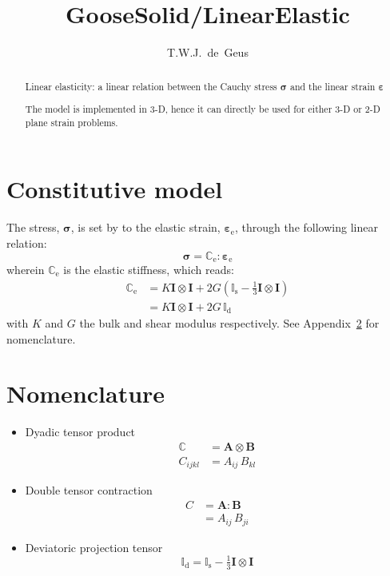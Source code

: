 \documentclass[times,namecite]{goose-article}
\title{%
  GooseSolid/LinearElastic
}
\author{T.W.J.~de~Geus}
\begin{document}
\maketitle

\begin{abstract}
Linear elasticity: a linear relation between the Cauchy stress $\bm{\sigma}$ and the linear strain $\bm{\varepsilon}$

The model is implemented in 3-D, hence it can directly be used for either 3-D or 2-D plane strain problems.
\end{abstract}



\section{Constitutive model}

The stress, $\bm{\sigma}$, is set by to the elastic strain, $\bm{\varepsilon}_\mathrm{e}$, through the following linear relation:
\begin{equation}
  \bm{\sigma} = \mathbb{C}_\mathrm{e} : \bm{\varepsilon}_\mathrm{e}
\end{equation}
wherein $\mathbb{C}_\mathrm{e}$ is the elastic stiffness, which reads:
\begin{align}\label{eq:model:elas}
  \mathbb{C}_\mathrm{e}
  &= K \bm{I} \otimes \bm{I} + 2 G (  \mathbb{I}_\mathrm{s} - \tfrac{1}{3} \bm{I} \otimes \bm{I} )
  \\
  &= K \bm{I} \otimes \bm{I} + 2 G \, \mathbb{I}_\mathrm{d}
\end{align}
with $K$ and $G$ the bulk and shear modulus respectively. See Appendix~\ref{sec:nomenclature} for nomenclature.

\appendix

\section{Nomenclature}
\label{sec:nomenclature}

\begin{itemize}
%
\item Dyadic tensor product
\begin{align}
  \mathbb{C} &= \bm{A} \otimes \bm{B} \\
  C_{ijkl}   &= A_{ij} \,      B_{kl}
\end{align}
%
\item Double tensor contraction
\begin{align}
  C &= \bm{A} : \bm{B} \\
    &= A_{ij} \, B_{ji}
\end{align}
%
\item Deviatoric projection tensor
%
\begin{equation}
  \mathbb{I}_\mathrm{d}
  = \mathbb{I}_\mathrm{s} - \tfrac{1}{3} \bm{I} \otimes \bm{I}
\end{equation}
%
\end{itemize}

% 
\end{document}
